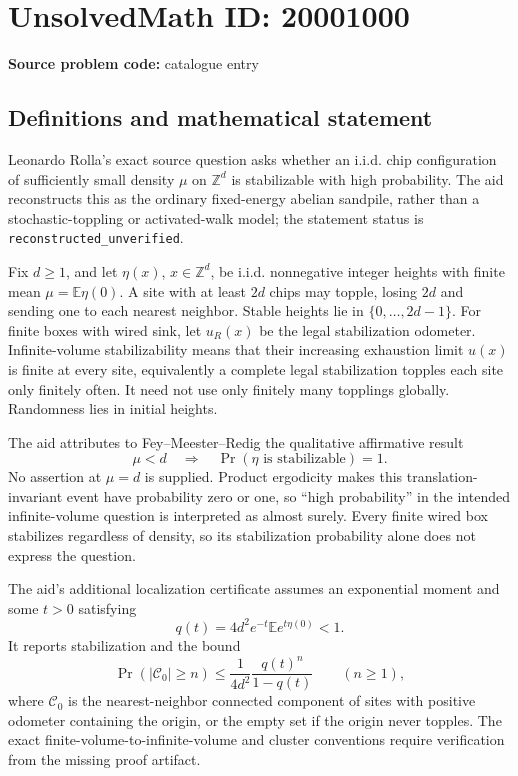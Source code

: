 \documentclass[11pt]{article}
\newcommand{\Z}{\mathbb{Z}}
\newcommand{\E}{\mathbb{E}}
\begin{document}
\section*{UnsolvedMath ID: 20001000}
\textbf{Source problem code:} catalogue entry
\subsection{Definitions and mathematical statement}
Leonardo Rolla's exact source question asks whether an i.i.d. chip configuration of sufficiently small density \(\mu\) on \(\Z^d\) is stabilizable with high probability. The aid reconstructs this as the ordinary fixed-energy abelian sandpile, rather than a stochastic-toppling or activated-walk model; the statement status is \texttt{reconstructed\_unverified}.

Fix \(d\ge1\), and let \(\eta(x)\), \(x\in\Z^d\), be i.i.d. nonnegative integer heights with finite mean \(\mu=\E\eta(0)\). A site with at least \(2d\) chips may topple, losing \(2d\) and sending one to each nearest neighbor. Stable heights lie in \(\{0,\ldots,2d-1\}\). For finite boxes with wired sink, let \(u_R(x)\) be the legal stabilization odometer. Infinite-volume stabilizability means that their increasing exhaustion limit \(u(x)\) is finite at every site, equivalently a complete legal stabilization topples each site only finitely often. It need not use only finitely many topplings globally. Randomness lies in initial heights.

The aid attributes to Fey--Meester--Redig the qualitative affirmative result
\[
 \mu<d\quad\Longrightarrow\quad
 \Pr(\eta\text{ is stabilizable})=1.
\]
No assertion at \(\mu=d\) is supplied. Product ergodicity makes this translation-invariant event have probability zero or one, so ``high probability'' in the intended infinite-volume question is interpreted as almost surely. Every finite wired box stabilizes regardless of density, so its stabilization probability alone does not express the question.

The aid's additional localization certificate assumes an exponential moment and some \(t>0\) satisfying
\[
 q(t)=4d^2e^{-t}\E e^{t\eta(0)}<1.
\]
It reports stabilization and the bound
\[
 \Pr(|\mathcal C_0|\ge n)\le
 \frac1{4d^2}\frac{q(t)^n}{1-q(t)}\qquad(n\ge1),
\]
where \(\mathcal C_0\) is the nearest-neighbor connected component of sites with positive odometer containing the origin, or the empty set if the origin never topples. The exact finite-volume-to-infinite-volume and cluster conventions require verification from the missing proof artifact.
\end{document}
